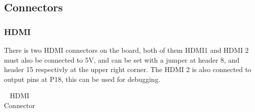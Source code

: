 \subsection{Connectors}
\subsubsection{HDMI}
There is two HDMI connectors on the board, both of them HDMI1 and HDMI 2 must also be connected to 5V, and can be set with a jumper at header 8, and header 15 respectivly at the upper right corner. The HDMI 2 is also connected to output pins at P18, this can be used for debugging.

\begin{table}[]
    \centering
    \caption{HDMI Connector}
    \label{HDMI Connector}
    \begin{tabular}{lllll}


\end{tabular}
\end{table}

